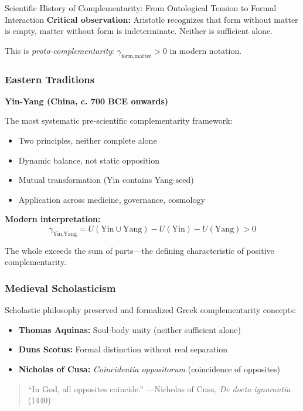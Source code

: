 \begin{chapter}{Scientific History of Complementarity: From Ontological Tension to Formal Interaction}
\textbf{Critical observation:} Aristotle recognizes that form without matter is empty, matter without form is indeterminate. Neither is sufficient alone.

This is \textit{proto-complementarity}: $\gamma_{\text{form,matter}} > 0$ in modern notation.

\subsubsection{Eastern Traditions}

\textbf{Yin-Yang (China, c. 700 BCE onwards)}

The most systematic pre-scientific complementarity framework:

\begin{itemize}[noitemsep]
    \item Two principles, neither complete alone
    \item Dynamic balance, not static opposition
    \item Mutual transformation (Yin contains Yang-seed)
    \item Application across medicine, governance, cosmology
\end{itemize}

\textbf{Modern interpretation:}
\[
\gamma_{\text{Yin,Yang}} = U(\text{Yin} \cup \text{Yang}) - U(\text{Yin}) - U(\text{Yang}) > 0
\]

The whole exceeds the sum of parts---the defining characteristic of positive complementarity.

\subsubsection{Medieval Scholasticism}

Scholastic philosophy preserved and formalized Greek complementarity concepts:

\begin{itemize}[noitemsep]
    \item \textbf{Thomas Aquinas:} Soul-body unity (neither sufficient alone)
    \item \textbf{Duns Scotus:} Formal distinction without real separation
    \item \textbf{Nicholas of Cusa:} \textit{Coincidentia oppositorum} (coincidence of opposites)
\end{itemize}

\begin{quote}
``In God, all opposites coincide.'' ---Nicholas of Cusa, \textit{De docta ignorantia} (1440)
\end{quote}


\end{chapter}
